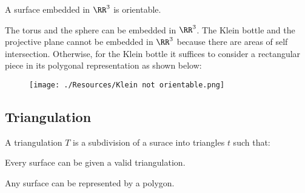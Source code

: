 \documentclass[12pt, a4paper]{article}
\begin{document}
\begin{proposition}
    A surface embedded in \(\RR^3\) is orientable.
\end{proposition}

\begin{mdexample}
    The torus and the sphere can be embedded in \(\RR^3\). The Klein bottle and the projective plane cannot be embedded in \(\RR^3\) because there are areas of self intersection. Otherwise, for the Klein bottle it suffices to consider a rectangular piece in its polygonal representation as shown below:
    \begin{figure}[H]
         \begin{center}
             \texttt{[image: ./Resources/Klein not orientable.png]}
         \end{center}
    \end{figure}
\end{mdexample}

\subsection{Triangulation}

\begin{definition}
    A triangulation \(T\) is a subdivision of a surace into triangles \(t\) such that:
\end{definition}

\begin{theorem}
    Every surface can be given a valid triangulation.
\end{theorem}

\begin{mdthm}
    Any surface can be represented by a polygon.
\end{mdthm}
\end{document}
